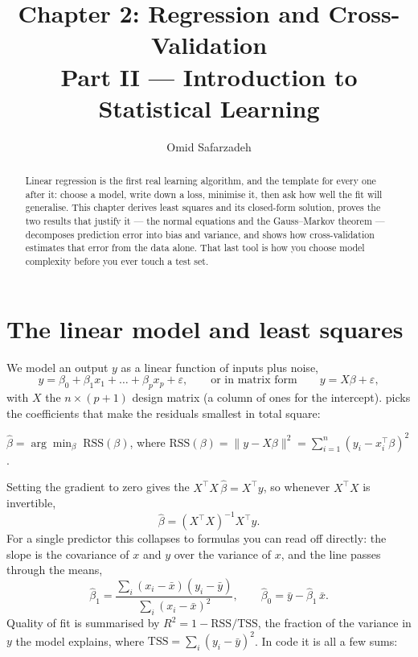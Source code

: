 \documentclass[11pt]{article}
\title{Chapter 2: Regression and Cross-Validation \\ \large Part II --- Introduction to Statistical Learning}
\author{Omid Safarzadeh}
\date{}
\begin{document}
\maketitle

\begin{abstract}
\noindent
Linear regression is the first real learning algorithm, and the template for
every one after it: choose a model, write down a loss, minimise it, then ask
how well the fit will generalise. This chapter derives least squares and its
closed-form solution, proves the two results that justify it --- the normal
equations and the Gauss--Markov theorem --- decomposes prediction error into
bias and variance, and shows how cross-validation estimates that error from
the data alone. That last tool is how you choose model complexity before you
ever touch a test set.
\end{abstract}

\tableofcontents

\section{The linear model and least squares}

We model an output $y$ as a linear function of inputs plus noise,
\[
  y = \beta_0 + \beta_1 x_1 + \dots + \beta_p x_p + \varepsilon,
  \qquad\text{or in matrix form}\qquad
  y = X\beta + \varepsilon,
\]
with $X$ the $n\times(p{+}1)$ design matrix (a column of ones for the
intercept).  picks the coefficients that make the
residuals smallest in total square:

\begin{definition}
$\hat\beta = \arg\min_\beta \; \mathrm{RSS}(\beta)$, where
$\mathrm{RSS}(\beta) = \|y - X\beta\|^2 = \sum_{i=1}^n (y_i - x_i^\top\beta)^2$.
\end{definition}

Setting the gradient to zero gives the 
$X^\top X\,\hat\beta = X^\top y$, so whenever $X^\top X$ is invertible,
\[
  \hat\beta = (X^\top X)^{-1} X^\top y.
\]
For a single predictor this collapses to formulas you can read off directly:
the slope is the covariance of $x$ and $y$ over the variance of $x$, and the
line passes through the means,
\[
  \hat\beta_1 = \frac{\sum_i (x_i-\bar x)(y_i-\bar y)}{\sum_i (x_i-\bar x)^2},
  \qquad
  \hat\beta_0 = \bar y - \hat\beta_1\,\bar x.
\]
Quality of fit is summarised by $R^2 = 1 - \mathrm{RSS}/\mathrm{TSS}$, the
fraction of the variance in $y$ the model explains, where
$\mathrm{TSS} = \sum_i (y_i-\bar y)^2$. In code it is all a few sums:
\end{document}
